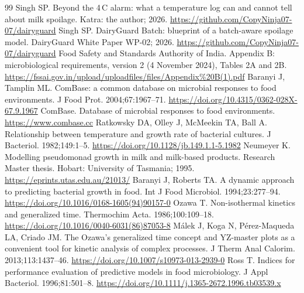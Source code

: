 \begin{thebibliography}{99}\small\setlength{\itemsep}{1pt}
 Singh SP. Beyond the 4\,\textdegree C alarm: what a temperature log can and cannot tell about milk spoilage. Katra: the author; 2026. \url{https://github.com/CopyNinja07-07/dairyguard}
 Singh SP. DairyGuard Batch: blueprint of a batch-aware spoilage model. DairyGuard White Paper WP-02; 2026. \url{https://github.com/CopyNinja07-07/dairyguard}
 Food Safety and Standards Authority of India. Appendix B: microbiological requirements, version 2 (4 November 2024), Tables 2A and 2B. \url{https://fssai.gov.in/upload/uploadfiles/files/Appendix%20B(1).pdf}
 Baranyi J, Tamplin ML. ComBase: a common database on microbial responses to food environments. J Food Prot. 2004;67:1967--71. \url{https://doi.org/10.4315/0362-028X-67.9.1967}
 ComBase. Database of microbial responses to food environments. \url{https://www.combase.cc}
 Ratkowsky DA, Olley J, McMeekin TA, Ball A. Relationship between temperature and growth rate of bacterial cultures. J Bacteriol. 1982;149:1--5. \url{https://doi.org/10.1128/jb.149.1.1-5.1982}
 Neumeyer K. Modelling pseudomonad growth in milk and milk-based products. Research Master thesis. Hobart: University of Tasmania; 1995. \url{https://eprints.utas.edu.au/21013/}
 Baranyi J, Roberts TA. A dynamic approach to predicting bacterial growth in food. Int J Food Microbiol. 1994;23:277--94. \url{https://doi.org/10.1016/0168-1605(94)90157-0}
 Ozawa T. Non-isothermal kinetics and generalized time. Thermochim Acta. 1986;100:109--18. \url{https://doi.org/10.1016/0040-6031(86)87053-8}
 Málek J, Koga N, Pérez-Maqueda LA, Criado JM. The Ozawa's generalized time concept and YZ-master plots as a convenient tool for kinetic analysis of complex processes. J Therm Anal Calorim. 2013;113:1437--46. \url{https://doi.org/10.1007/s10973-013-2939-0}
 Ross T. Indices for performance evaluation of predictive models in food microbiology. J Appl Bacteriol. 1996;81:501--8. \url{https://doi.org/10.1111/j.1365-2672.1996.tb03539.x}
\end{thebibliography}


